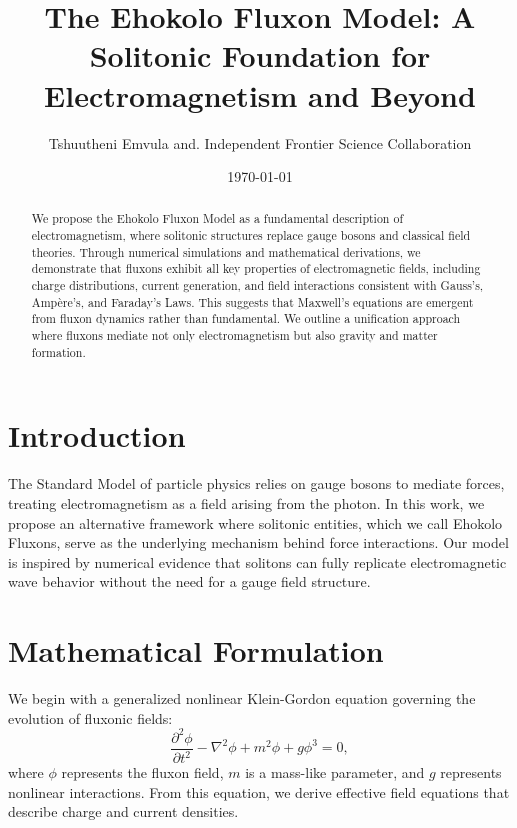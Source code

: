 \documentclass{article}
\title{The Ehokolo Fluxon Model: A Solitonic Foundation for Electromagnetism and Beyond}
\author{Tshuutheni Emvula and. Independent Frontier Science Collaboration}
\date{\today}
\begin{document}
\maketitle

\begin{abstract}
We propose the Ehokolo Fluxon Model as a fundamental description of electromagnetism, where solitonic structures replace gauge bosons and classical field theories. Through numerical simulations and mathematical derivations, we demonstrate that fluxons exhibit all key properties of electromagnetic fields, including charge distributions, current generation, and field interactions consistent with Gauss’s, Ampère’s, and Faraday’s Laws. This suggests that Maxwell’s equations are emergent from fluxon dynamics rather than fundamental. We outline a unification approach where fluxons mediate not only electromagnetism but also gravity and matter formation.
\end{abstract}

\section{Introduction}
The Standard Model of particle physics relies on gauge bosons to mediate forces, treating electromagnetism as a field arising from the photon. In this work, we propose an alternative framework where solitonic entities, which we call Ehokolo Fluxons, serve as the underlying mechanism behind force interactions. Our model is inspired by numerical evidence that solitons can fully replicate electromagnetic wave behavior without the need for a gauge field structure.

\section{Mathematical Formulation}
We begin with a generalized nonlinear Klein-Gordon equation governing the evolution of fluxonic fields:
\begin{equation}
\frac{\partial^2 \phi}{\partial t^2} - \nabla^2 \phi + m^2 \phi + g \phi^3 = 0,
\end{equation}
where $\phi$ represents the fluxon field, $m$ is a mass-like parameter, and $g$ represents nonlinear interactions. From this equation, we derive effective field equations that describe charge and current densities.
\end{document}
